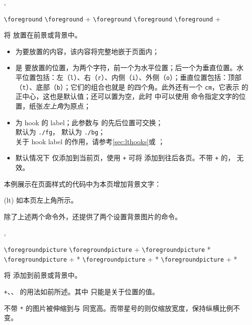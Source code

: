 \documentclass{cusdoc}
\begin{document}
\begin{function}{\foreground,\background}
  \begin{syntax}
    \verb|\foreground|   
    \verb|\foreground| + 
    \verb|\foreground|  
    \verb|\foreground|  
    \verb|\foreground| +   
  \end{syntax}
将  放置在前景或背景中。

\begin{itemize}[nosep]
  \item {} 为要放置的内容，该内容将完整地嵌于页面内；
  \item {} 是  要放置的位置，为两个字符，前一个为水平位置；后一个为垂直位置。水平位置包括：左（\texttt{l}）、右（\texttt{r}）、内侧（\texttt{i}）、外侧（\texttt{o}）；垂直位置包括：顶部（\texttt{t}）、底部（\texttt{b}）；它们的组合也就是  的四个角。此外还有一个 \texttt{cm}，它表示  的正中心，这也是默认值；还可以置为空，此时  中可以使用  命令指定文字的位置，纸张\emph{左上角}为原点；
  \item {} 为 hook 的 label；此参数与  的先后位置可交换；\\ 
   默认为 \texttt{./fg}， 默认为 \texttt{./bg}；\\
  关于 hook label 的作用，请参考\cref{sec:lthooks}或 ；
  \item 默认情况下  仅添加到当前页，使用 \texttt{+} 可将  添加到往后各页。不带 \texttt+ 的， 无效。
\end{itemize}
\end{function}

本例展示在页面样式的代码中为本页增加背景文字：
\needspace{3cm}
\begin{xample}
\background(lt){\textcolor{red}{\LARGE\CusTeX}}
\stopxamplecode
\xampleprint
如本页左上角所示。
\end{xample}

除了上述两个命令外，还提供了两个设置背景图片的命令。

\begin{function}{\foregroundpicture,\backgroundpicture}
  \begin{syntax}
    \verb|\foregroundpicture|     
    \verb|\foregroundpicture| +   
    \verb|\foregroundpicture|   * 
    \verb|\foregroundpicture| + * 
    \verb|\foregroundpicture| + *   
    \verb|\foregroundpicture| + *    
  \end{syntax}
将  添加到前景或背景中。

\texttt{+}、、 的用法如前所述。其中  只能是关于位置的值。

不带 \verb|*| 的图片被伸缩到与  同宽高。而带星号的则仅缩放宽度，保持纵横比例不变。
\end{function}
\end{document}
